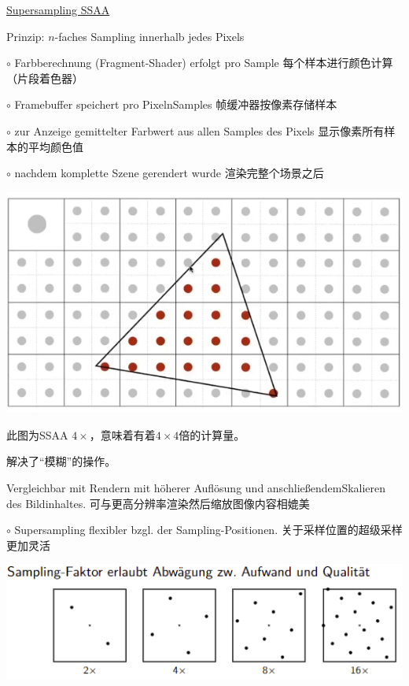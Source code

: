 \documentclass[fleqn]{article}
\begin{document}
\noindent\underline{Supersampling SSAA}

\noindent Prinzip: $n$-faches Sampling innerhalb jedes Pixels

$\circ$ Farbberechnung (Fragment-Shader) erfolgt pro Sample 每个样本进行颜色计算（片段着色器）

$\circ$ Framebuffer speichert pro PixelnSamples 帧缓冲器按像素存储样本

$\circ$ zur Anzeige gemittelter Farbwert aus allen Samples des Pixels 显示像素所有样本的平均颜色值

\indent\indent $\circ$ nachdem komplette Szene gerendert wurde 渲染完整个场景之后  

\begin{center}
    \includegraphics[scale=0.2]{21.png}
\end{center}

此图为SSAA $4\times$，意味着有着$4\times4$倍的计算量。

解决了“模糊”的操作。



Vergleichbar mit Rendern mit höherer Auflösung und anschließendemSkalieren des Bildinhaltes. 可与更高分辨率渲染然后缩放图像内容相媲美

$\circ$ Supersampling flexibler bzgl. der Sampling-Positionen. 关于采样位置的超级采样更加灵活

\begin{center}
    \includegraphics[scale=0.6]{22.png}
\end{center}
\end{document}

